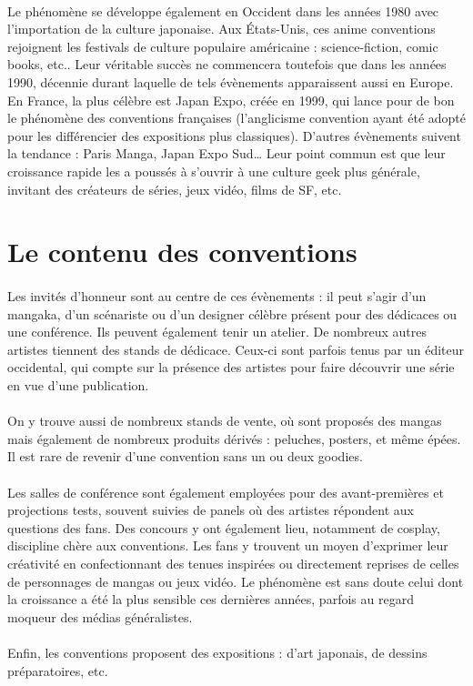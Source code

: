 \paragraph{}
Le phénomène se développe également en Occident dans les années 1980 avec l’importation de la culture japonaise. Aux États-Unis, ces anime conventions rejoignent les festivals de culture populaire américaine : science-fiction, comic books, etc.. Leur véritable succès ne commencera toutefois que dans les années 1990, décennie durant laquelle de tels évènements apparaissent aussi en Europe. En France, la plus célèbre est Japan Expo, créée en 1999, qui lance pour de bon le phénomène des conventions françaises (l’anglicisme convention ayant été adopté pour les différencier des expositions plus classiques). D’autres évènements suivent la tendance : Paris Manga, Japan Expo Sud… Leur point commun est que leur croissance rapide les a poussés à s’ouvrir à une culture geek plus générale, invitant des créateurs de séries, jeux vidéo, films de SF, etc.

\section{Le contenu des conventions}
\paragraph{}
Les invités d’honneur sont au centre de ces évènements : il peut s’agir d’un mangaka, d’un scénariste ou d’un designer célèbre présent pour des dédicaces ou une conférence. Ils peuvent également tenir un atelier. De nombreux autres artistes tiennent des stands de dédicace. Ceux-ci sont parfois tenus par un éditeur occidental, qui compte sur la présence des artistes pour faire découvrir une série en vue d’une publication.
\paragraph{}
On y trouve aussi de nombreux stands de vente, où sont proposés des mangas mais également de nombreux produits dérivés : peluches, posters, et même épées. Il est rare de revenir d’une convention sans un ou deux goodies.
\paragraph{}
Les salles de conférence sont également employées pour des avant-premières et projections tests, souvent suivies de panels où des artistes répondent aux questions des fans. Des concours y ont également lieu, notamment de cosplay, discipline chère aux conventions. Les fans y trouvent un moyen d’exprimer leur créativité en confectionnant des tenues inspirées ou directement reprises de celles de personnages de mangas ou jeux vidéo. Le phénomène est sans doute celui dont la croissance a été la plus sensible ces dernières années, parfois au regard moqueur des médias généralistes.
\paragraph{}
Enfin, les conventions proposent des expositions : d’art japonais, de dessins préparatoires, etc.
